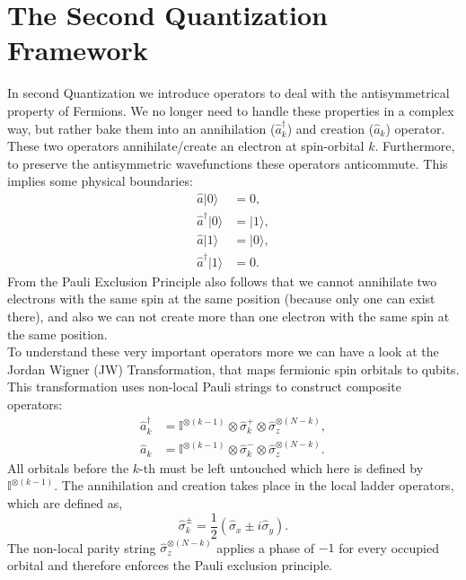 \section{The Second Quantization Framework}\label{sec:the-second-quantization-framework}
In second Quantization we introduce operators to deal with the antisymmetrical property of Fermions.
We no longer need to handle these properties in a complex way, but rather bake them into an annihilation ($\hat{a}^\dagger_k$) and creation ($\hat{a}_k$) operator.
These two operators annihilate/create an electron at spin-orbital $k$.
Furthermore, to preserve the antisymmetric wavefunctions these operators anticommute.
This implies some physical boundaries:
\begin{align}
    \hat{a} |0\rangle &= 0, \\
    \hat{a}^\dagger |0\rangle &= |1\rangle, \\
    \hat{a} |1\rangle &= |0\rangle, \\
    \hat{a}^\dagger |1\rangle &= 0.
\end{align}
From the Pauli Exclusion Principle also follows that we cannot annihilate two electrons with the same spin at the same position (because only one can exist there), and also we can not create more than one electron with the same spin at the same position. \\
To understand these very important operators more we can have a look at the Jordan Wigner (JW) Transformation, that maps fermionic spin orbitals to qubits.
This transformation uses non-local Pauli strings to construct composite operators:
\begin{align}
    \label{eq:creation_op_jd_transformation}
    \hat{a}_k^\dagger &= \mathbb{I}^{\otimes (k-1)} \otimes \hat{\sigma}_k^+ \otimes \hat{\sigma}_z^{\otimes (N-k)}, \\
    \label{eq:annhilation_op_jd_transformation}
    \hat{a}_k &= \mathbb{I}^{\otimes (k-1)} \otimes \hat{\sigma}_k^- \otimes \hat{\sigma}_z^{\otimes (N-k)}.
\end{align}
All orbitals before the $k$-th must be left untouched which here is defined by $\mathbb{I}^{\otimes (k-1)}$.
The annihilation and creation takes place in the local ladder operators, which are defined as,
\begin{equation}
    \hat{\sigma}_k^\pm = \frac{1}{2}(\hat{\sigma}_x \pm i\hat{\sigma}_y).\label{eq:ladder_operators}
\end{equation}
The non-local parity string $\hat{\sigma}_z^{\otimes (N-k)}$ applies a phase of $-1$ for every occupied orbital and therefore enforces the Pauli exclusion principle.

